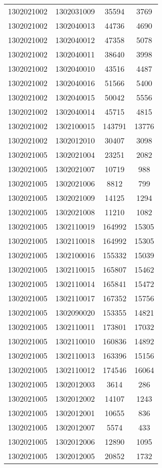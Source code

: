 \begin{longtable}[h]{llcc}
		1302021002 & 1302031009 & 35594 & 3769\\
		1302021002 & 1302040013 & 44736 & 4690\\
		1302021002 & 1302040012 & 47358 & 5078\\
		1302021002 & 1302040011 & 38640 & 3998\\
		1302021002 & 1302040010 & 43516 & 4487\\
		1302021002 & 1302040016 & 51566 & 5400\\
		1302021002 & 1302040015 & 50042 & 5556\\
		1302021002 & 1302040014 & 45715 & 4815\\
		1302021002 & 1302100015 & 143791 & 13776\\
		1302021002 & 1302012010 & 30407 & 3098\\
		1302021005 & 1302021004 & 23251 & 2082\\
		1302021005 & 1302021007 & 10719 & 988\\
		1302021005 & 1302021006 & 8812 & 799\\
		1302021005 & 1302021009 & 14125 & 1294\\
		1302021005 & 1302021008 & 11210 & 1082\\
		1302021005 & 1302110019 & 164992 & 15305\\
		1302021005 & 1302110018 & 164992 & 15305\\
		1302021005 & 1302100016 & 155332 & 15039\\
		1302021005 & 1302110015 & 165807 & 15462\\
		1302021005 & 1302110014 & 165841 & 15472\\
		1302021005 & 1302110017 & 167352 & 15756\\
		1302021005 & 1302090020 & 153355 & 14821\\
		1302021005 & 1302110011 & 173801 & 17032\\
		1302021005 & 1302110010 & 160836 & 14892\\
		1302021005 & 1302110013 & 163396 & 15156\\
		1302021005 & 1302110012 & 174546 & 16064\\
		1302021005 & 1302012003 & 3614 & 286\\
		1302021005 & 1302012002 & 14107 & 1243\\
		1302021005 & 1302012001 & 10655 & 836\\
		1302021005 & 1302012007 & 5574 & 433\\
		1302021005 & 1302012006 & 12890 & 1095\\
		1302021005 & 1302012005 & 20852 & 1732\\

\end{longtable}
